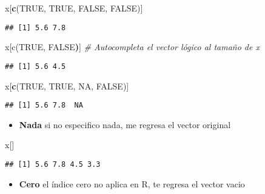\documentclass[]{article}
\newenvironment{Shaded}{\begin{snugshade}}{\end{snugshade}}
\newcommand{\KeywordTok}[1]{\textcolor[rgb]{0.13,0.29,0.53}{\textbf{{#1}}}}
\newcommand{\CommentTok}[1]{\textcolor[rgb]{0.56,0.35,0.01}{\textit{{#1}}}}
\newcommand{\OtherTok}[1]{\textcolor[rgb]{0.56,0.35,0.01}{{#1}}}
\newcommand{\ErrorTok}[1]{\textbf{{#1}}}
\newcommand{\NormalTok}[1]{{#1}}
\begin{document}
\begin{Shaded}
\begin{Highlighting}[]
\NormalTok{x[}\KeywordTok{c}\NormalTok{(}\OtherTok{TRUE}\NormalTok{, }\OtherTok{TRUE}\NormalTok{, }\OtherTok{FALSE}\NormalTok{, }\OtherTok{FALSE}\NormalTok{)]}
\end{Highlighting}
\end{Shaded}

\begin{verbatim}
## [1] 5.6 7.8
\end{verbatim}

\begin{Shaded}
\begin{Highlighting}[]
\NormalTok{x[c(}\OtherTok{TRUE}\NormalTok{, }\OtherTok{FALSE}\ErrorTok{)}\NormalTok{] }\CommentTok{# Autocompleta el vector lógico al tamaño de x}
\end{Highlighting}
\end{Shaded}

\begin{verbatim}
## [1] 5.6 4.5
\end{verbatim}

\begin{Shaded}
\begin{Highlighting}[]
\NormalTok{x[}\KeywordTok{c}\NormalTok{(}\OtherTok{TRUE}\NormalTok{, }\OtherTok{TRUE}\NormalTok{, }\OtherTok{NA}\NormalTok{, }\OtherTok{FALSE}\NormalTok{)]}
\end{Highlighting}
\end{Shaded}

\begin{verbatim}
## [1] 5.6 7.8  NA
\end{verbatim}

\begin{itemize}
\itemsep1pt\parskip0pt
\item
  \textbf{Nada} si no especifico nada, me regresa el vector original
\end{itemize}

\begin{Shaded}
\begin{Highlighting}[]
\NormalTok{x[]}
\end{Highlighting}
\end{Shaded}

\begin{verbatim}
## [1] 5.6 7.8 4.5 3.3
\end{verbatim}

\begin{itemize}
\itemsep1pt\parskip0pt
\item
  \textbf{Cero} el índice cero no aplica en R, te regresa el vector
  vacio
\end{itemize}
\end{document}
